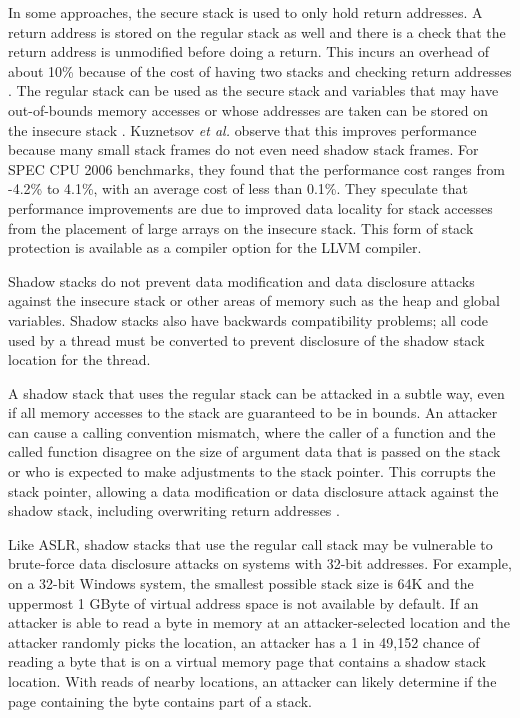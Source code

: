 In some approaches, the secure stack is used to only hold return addresses.
A return address is stored on the regular stack as well and there is a
check that the return address is unmodified before doing a return.
This incurs an overhead of about 10\% because of the cost of having two
stacks and checking return addresses \cite{Dang2015}.   The
regular stack can be used as the secure stack and variables
that may have out-of-bounds memory accesses or whose addresses are taken
can be stored on the insecure stack \cite{Bhatkar2005, Kuznetsov2014}.  
Kuznetsov {\it et al.}   
\cite{Kuznetsov2014} observe that this improves performance because
many small stack frames do not even need shadow stack frames.  For
SPEC CPU 2006 benchmarks, they found that the performance cost 
ranges from -4.2\% to 4.1\%,
with an average cost of less than 0.1\%.  They speculate
that performance improvements are due to improved data locality for
stack accesses from the placement of large arrays on the insecure stack.
This form of stack protection is available as a compiler option 
for the LLVM compiler.

Shadow stacks do not prevent data modification and data disclosure attacks
against the insecure stack or other areas of memory such as the heap 
and global variables.  Shadow stacks also have backwards compatibility
problems; all code used by a thread must be converted to prevent disclosure
of the shadow stack location for the thread.  

A shadow stack that uses the regular stack can be attacked in
a subtle way, even if all memory accesses to the stack
are guaranteed to be in bounds.  An attacker can cause a calling convention
mismatch, where the caller of a function and the called function disagree on
the size of argument data that is passed on the stack or who is expected to
make adjustments to the stack pointer.  This corrupts the stack pointer, 
allowing a data modification or data disclosure attack against the shadow stack, including overwriting return addresses \cite{Goktas2014}.

Like ASLR, shadow stacks that use the regular call stack may be vulnerable to 
brute-force data disclosure attacks on systems with 32-bit addresses.
For example, on a 32-bit Windows system, the smallest possible
stack size is 64K and the uppermost 1 GByte of virtual address space
is not available by default.  If an attacker is able to read a byte 
in memory at an attacker-selected location and the attacker randomly picks
the location,  an attacker has a 1 in 49,152 
chance of reading a byte that is on a virtual memory page that contains a 
shadow stack location.  With reads of nearby locations, an attacker can likely 
determine if the page containing the byte contains part of a stack.

